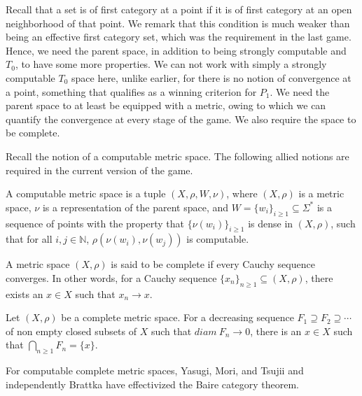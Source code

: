\documentclass[a4paper,UKenglish,autoref,thm-restate,numberwithinsect]{lipics-v2021}
\begin{document}
Recall that a set is of first category at a point if it is of first category at an open neighborhood of that point. We remark that this condition is much weaker than being an effective first category set, which was the requirement in the last game. Hence, we need the parent space, in addition to being strongly computable and $T_0$, to have some more properties. We can not work with simply a strongly computable $T_0$ space here, unlike earlier, for there is no notion of convergence at a point, something that qualifies as a winning criterion for $P_1$. We need the parent space to at least be equipped with a metric, owing to which we can quantify the convergence at every stage of the game. We also require the space to be complete. 

Recall the notion of a computable metric space. The following allied notions are required in the current version of the game. 
\begin{definition}
	A computable metric space is a tuple $(X,\rho,W,\nu)$, where $(X,\rho)$ is a metric space, $\nu$ is a representation of the	parent space, and $W=\{w_i\}_{i\geq1}\subseteq\Sigma^*$ is a sequence of points with the property that $\{\nu(w_i)\}_{i\geq1}$ is dense in $(X,\rho)$, such that for all $i,j\in\mathbb{N}$, $\rho(\nu(w_i),\nu(w_j))$ is computable. 
\end{definition}
\begin{definition}
	A metric space $(X,\rho)$ is said to be complete if every Cauchy sequence converges. In other words, for a Cauchy	sequence $\{x_n\}_{n\geq1}\subseteq(X,\rho)$, there exists an $x\in X$ such that $x_n\rightarrow x$. 
\end{definition}
\begin{lemma}[Cantor]\label{lem:cantor}
	Let $(X,\rho)$ be a complete metric space. For a decreasing sequence $F_1\supseteq F_2\supseteq \cdots$ of non empty closed subsets of $X$ such that $diam\ F_n\rightarrow0$, there is an $x\in X$ such that $\bigcap_{n\geq1}F_n=\{x\}$. 
\end{lemma}

For computable complete metric spaces, Yasugi, Mori, and Tsujii \cite{YMT99} and independently Brattka \cite{Brattka2001} have effectivized the Baire category theorem. 
\end{document}
